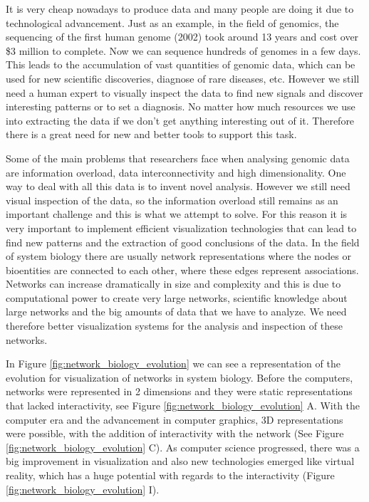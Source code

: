 It is very cheap nowadays to produce data and many people are doing it due to technological advancement. Just as an example, in the field of genomics, the sequencing of the first human genome (2002) took around 13 years and cost over \$3 million to complete. Now we can sequence hundreds of genomes in a few days\cite{big_biological_impacts_bd}. This leads to the accumulation of vast quantities of genomic data, which can be used for new scientific discoveries, diagnose of rare diseases, etc. However we still need a human expert to visually inspect the data to find new signals and discover interesting patterns or to set a diagnosis. No matter how much resources we use into extracting the data if we don't get anything interesting out of it\cite{zhang_paciorkowski_craig_cui_2019}. Therefore there is a great need for new and better tools to support this task.

Some of the main problems that researchers face when analysing genomic data are information overload, data interconnectivity and high dimensionality. One way to deal with all this data is to invent novel analysis. However we still need visual inspection of the data, so the information overload still remains as an important challenge and this is what we attempt to solve. For this reason it is very important to implement efficient visualization technologies that can lead to find new patterns and the extraction of good conclusions of the data. In the field of system biology there are usually network representations where the nodes or bioentities are connected to each other, where these edges represent associations. Networks can increase dramatically in size and complexity and this is due to computational power to create very large networks, scientific knowledge about large networks and the big amounts of data that we have to analyze. We need therefore better visualization systems for the analysis and inspection of these networks.

In Figure \ref{fig:network_biology_evolution} we can see a representation of the evolution for visualization of networks in system biology. Before the computers, networks were represented in 2 dimensions and they were static representations that lacked interactivity, see Figure \ref{fig:network_biology_evolution} A. With the computer era and the advancement in computer graphics, 3D representations were possible, with the addition of interactivity with the network (See Figure  \ref{fig:network_biology_evolution} C). As computer science progressed, there was a big improvement in visualization and also new technologies emerged like virtual reality, which has a huge potential with regards to the interactivity (Figure \ref{fig:network_biology_evolution} I).

